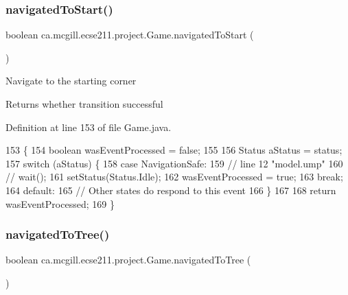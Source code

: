 \subsubsection{\texorpdfstring{navigated\+To\+Start()}{navigatedToStart()}}
{\footnotesize\ttfamily boolean ca.\+mcgill.\+ecse211.\+project.\+Game.\+navigated\+To\+Start (\begin{DoxyParamCaption}{ }\end{DoxyParamCaption})}

Navigate to the starting corner

\begin{DoxyReturn}{Returns}
whether transition successful 
\end{DoxyReturn}


Definition at line 153 of file Game.\+java.


\begin{DoxyCode}
153                                     \{
154     \textcolor{keywordtype}{boolean} wasEventProcessed = \textcolor{keyword}{false};
155 
156     Status aStatus = status;
157     \textcolor{keywordflow}{switch} (aStatus) \{
158       \textcolor{keywordflow}{case} NavigationSafe:
159         \textcolor{comment}{// line 12 "model.ump"}
160         \textcolor{comment}{// wait();}
161         setStatus(Status.Idle);
162         wasEventProcessed = \textcolor{keyword}{true};
163         \textcolor{keywordflow}{break};
164       \textcolor{keywordflow}{default}:
165         \textcolor{comment}{// Other states do respond to this event}
166     \}
167 
168     \textcolor{keywordflow}{return} wasEventProcessed;
169   \}
\end{DoxyCode}
\mbox{\label{enumca_1_1mcgill_1_1ecse211_1_1project_1_1_game_aed641f9ade50f0090096a46d90588eb7}} 
\subsubsection{\texorpdfstring{navigated\+To\+Tree()}{navigatedToTree()}}
{\footnotesize\ttfamily boolean ca.\+mcgill.\+ecse211.\+project.\+Game.\+navigated\+To\+Tree (\begin{DoxyParamCaption}{ }\end{DoxyParamCaption})}

